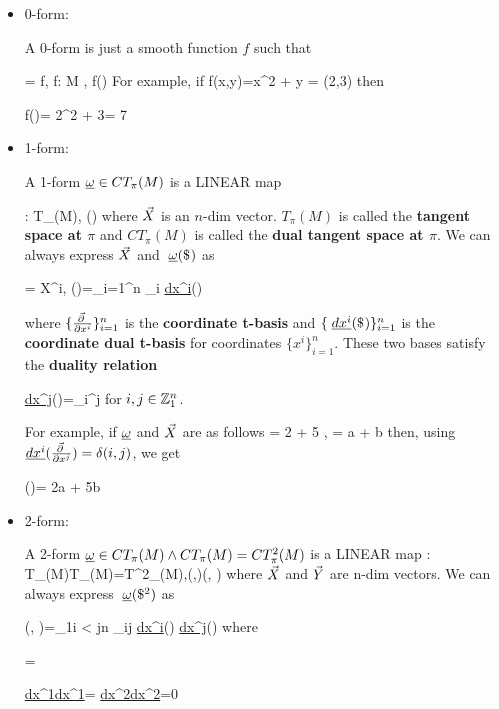 \begin{itemize}
\item  0-form:

A 0-form is just
a smooth function $f$ such that

\beq
\ul{\omega} = f,\quad
f: M\rarrow \RR
,\quad
\pi \mapsto  f(\pi)
\eeq
For example,
if
\beq
f(x,y)=x^2 + y \quad {}
\quad \pi= (2,3)\eeq
then

\beq f(\pi)= 2^2 + 3= 7
\eeq

\item 1-form:

A 1-form
$\ul{\omega}\in  CT_\pi(M)$ is a LINEAR map

\beq
\ul{\omega}: T_\pi(M)\rarrow \RR,\quad
\vecX\mapsto \ul{\omega}(\vecX)
\eeq
where ${\vec{X}}$ is an $n$-dim vector.
$T_\pi(M)$ is called the {\bf tangent space at $\pi$} and
$ CT_\pi(M)$ is called the {\bf dual tangent space at $\pi$}.
We can always 
express ${\vec{X}}$ and $\pform{\omega}{}$
as

\beq
\vecX = X^i, \quad
\ul{\omega}(\vecX)=\sum_{i=1}^n \omega_i \ul{dx^i}(\vecX)
\eeq

where
$\{\frac{\vec{\partial}\;}{\partial x^i}\}_{i=1}^n$
is the {\bf coordinate t-basis} and $\{\pform{dx^i}{}\}_{i=1}^n$
is the {\bf coordinate dual t-basis}  for coordinates
$\{x^i\}_{i=1}^n$.
 These two bases satisfy
the {\bf duality relation}

\beq
\ul{dx^j}()=\delta_i^j
\eeq
for $i, j\in{\mathbb{Z}}_1^n$.

For example,
if $\ul{\omega}$ and ${\vec{X}}$ 
are as follows
\beq
\pform{\omega}{}= 2 
+ 5 ,
\quad
\vecX = a 
+ b 
\eeq
then,
using $\ul{dx^i}(\vecpder{x^j})=\delta(i,j)$, we get

\beq
\ul{\omega}(\vecX)=
2a + 5b
\eeq

\item 2-form:

A 2-form
$\ul{\omega}\in  CT_\pi(M)\wedge  CT_\pi(M)=CT^2_\pi(M)$
is a LINEAR map
\beq
\ul{\omega}: T_\pi(M)\times T_\pi(M)=T^2_\pi(M)\rarrow \RR,\quad (\vecX,\vecY)\mapsto \ul{\omega}(\vecX, \vecY)
\eeq
where ${\vec{X}}$ and ${\vec{Y}}$ are n-dim vectors.
We can always 
express $\pform{\omega}{2}$
as

\beq
\ul{\omega}(\vecX, \vecY)=\sum_{1\leq i < j\leq n} \omega_{ij} \ul{dx^i}(\vecX)
\wedge \ul{dx^j}(\vecY)
\eeq
where

\beq
{}\wedge {}=
\eeq


\beq
\ul{dx^1}\wedge \ul{dx^1}=
\ul{dx^2}\wedge \ul{dx^2}=0
\eeq


\end{itemize}
